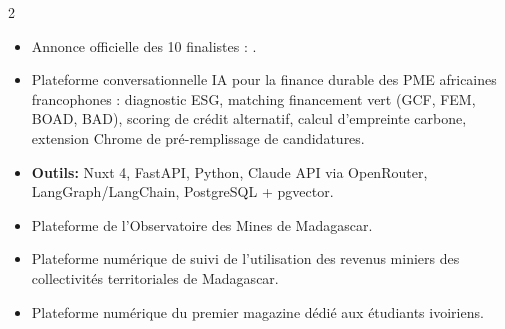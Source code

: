\documentclass[10pt,a4paper,ragged2e,withhyper]{altacv}
\begin{document}
\begin{paracol}{2}
            \begin{itemize}
                \item Annonce officielle des 10 finalistes : .
                \item Plateforme conversationnelle IA pour la finance durable des PME africaines francophones : diagnostic ESG, matching financement vert (GCF, FEM, BOAD, BAD), scoring de crédit alternatif, calcul d'empreinte carbone, extension Chrome de pré-remplissage de candidatures.
                \item \textcolor{SecondaryColor}{\textbf{Outils: }} Nuxt 4, FastAPI, Python, Claude API via OpenRouter, LangGraph/LangChain, PostgreSQL + pgvector.
            \end{itemize}
            \divider

            \begin{itemize}
                \item Plateforme de l'Observatoire des Mines de Madagascar.
            \end{itemize}
            \divider

            \begin{itemize}
                \item Plateforme numérique de suivi de l'utilisation des revenus miniers des collectivités territoriales de Madagascar.
            \end{itemize}
            \divider

            \begin{itemize}
                \item Plateforme numérique du premier magazine dédié aux étudiants ivoiriens.
            \end{itemize}



\end{paracol}
\end{document}
